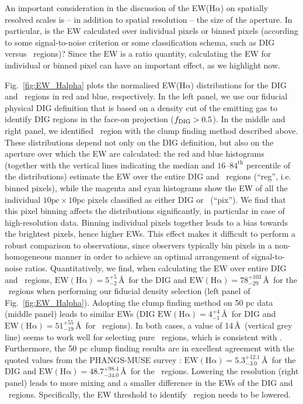 \documentclass[fleqn,usenatbib]{mnras}
\newcommand\HII{\ion{H}{II}~} %
\begin{document}
An important consideration in the discussion of the EW(H$\alpha$) on spatially resolved scales is -- in addition to spatial resolution -- the size of the aperture. In particular, is the EW calculated over individual pixels or binned pixels (according to some signal-to-noise criterion or some classification schema, such as DIG versus \HII regions)? Since the EW is a ratio quantity, calculating the EW for individual or binned pixel can have an important effect, as we highlight now. 

Fig.~\ref{fig:EW_Halpha} plots the normalised EW(H$\alpha$) distributions for the DIG and \HII regions in red and blue, respectively. In the left panel, we use our fiducial physical DIG definition that is based on a density cut of the emitting gas to identify DIG regions in the face-on projection ($f_{\rm DIG}>0.5$). In the middle and right panel, we identified \HII region with the clump finding method described above. These distributions depend not only on the DIG definition, but also on the aperture over which the EW are calculated: the red and blue histograms (together with the vertical lines indicating the median and $16$--$84^\text{th}$ percentile of the distributions) estimate the EW over the entire DIG and \HII regions (``reg'', i.e. binned pixels), while the magenta and cyan histograms show the EW of all the individual $10\mathrm{pc}\times10\mathrm{pc}$ pixels classified as either DIG or \HII (``pix''). We find that this pixel binning affects the distributions significantly, in particular in case of high-resolution data. Binning individual pixels together leads to a bias towards the brightest pixels, hence higher EWs. This effect makes it difficult to perform a robust comparison to observations, since observers typically bin pixels in a non-homogeneous manner in order to achieve an optimal arrangement of signal-to-noise ratios. Quantitatively, we find, when calculating the EW over entire DIG and \HII regions, $\mathrm{EW(H\alpha)}=5_{-2}^{+5}$\,\AA\ for the DIG and $\mathrm{EW(H\alpha)}=78_{-29}^{+103}$\,\AA\ for the \HII regions when performing our fiducial density selection (left panel of Fig.~\ref{fig:EW_Halpha}). Adopting the clump finding method on 50 pc data (middle panel) leads to similar EWs (DIG $\mathrm{EW(H\alpha)}=4_{-1}^{+4}$\,\AA\ for DIG and 
$\mathrm{EW(H\alpha)}=51_{-19}^{+55}$\,\AA\ for \HII regions). In both cases, a value of 14\,\AA\ (vertical grey line) seems to work well for selecting pure \HII regions, which is consistent with \citet{lacerda18}. Furthermore, the 50 pc clump finding results are in excellent agreement with the quoted values from the PHANGS-MUSE survey \citep{belfiore22}: $\mathrm{EW(H\alpha)}=5.3_{-3.0}^{+12.1}$\,\AA\ for the DIG and $\mathrm{EW(H\alpha)}=48.7_{-34.0}^{+98.4}$\,\AA\ for the \HII regions. Lowering the resolution (right panel) leads to more mixing and a smaller difference in the EWs of the DIG and \HII regions. Specifically, the EW threshold to identify \HII region needs to be lowered. 
\end{document}
